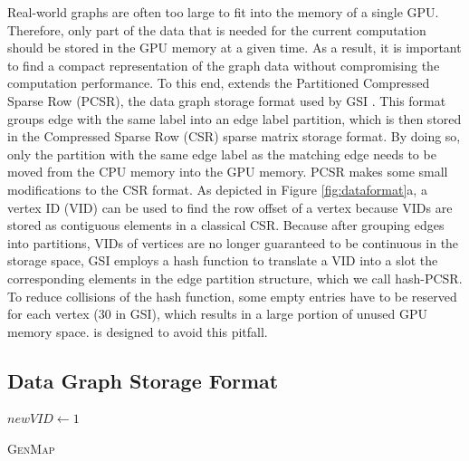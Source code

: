 Real-world graphs are often too large to fit into the memory of a single GPU. Therefore, only part of the data that is needed for the
current computation should be stored in the GPU memory at a given time. As a result, it is important to find a compact representation of
the graph data without compromising the computation performance. To this end, \SystemName extends the Partitioned Compressed Sparse Row
(PCSR), the data graph storage format used by GSI \cite{zeng2020gsi}. This format groups edge with the same label into an edge label partition,
which is then stored in the Compressed Sparse Row (CSR) sparse matrix storage format. By doing so, only the partition with
the same edge label as the matching edge needs to be moved from the CPU memory into the GPU memory. PCSR makes some small modifications to
the CSR format. As depicted in Figure \ref{fig:dataformat}a, a vertex ID (VID) can be used to find the row offset of a vertex because VIDs are stored
as contiguous elements in a classical CSR. Because after grouping edges into partitions, VIDs of vertices are no longer guaranteed to be
continuous in the storage space, GSI employs a hash function to translate a VID into a slot the corresponding elements in the edge partition structure, which we call hash-PCSR. To reduce collisions of the hash function, some empty entries have to be reserved
for each vertex (30 in GSI), which results in a large portion of unused GPU memory space. \SystemName is designed to avoid this pitfall.


\subsection{\SystemName Data Graph Storage Format}

\begin{algorithm}[t!]
$newVID \leftarrow 1$\;
\caption{\textsc{GenMap}}
\label{algo:genmap}
\end{algorithm}

